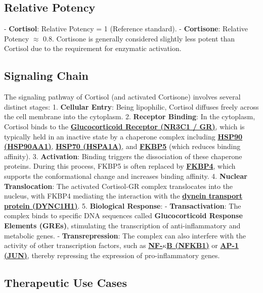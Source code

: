 \documentclass{article}
\begin{document}
\subsection{Relative Potency}
- \textbf{Cortisol}: Relative Potency = 1 (Reference standard).
- \textbf{Cortisone}: Relative Potency $\approx$ 0.8. Cortisone is generally considered slightly less potent than Cortisol due to the requirement for enzymatic activation.

\subsection{Signaling Chain}
The signaling pathway of Cortisol (and activated Cortisone) involves several distinct stages:
1. \textbf{Cellular Entry}: Being lipophilic, Cortisol diffuses freely across the cell membrane into the cytoplasm.
2. \textbf{Receptor Binding}: In the cytoplasm, Cortisol binds to the \textbf{\href{https://www.proteinatlas.org/ENSG00000113580-NR3C1}{Glucocorticoid Receptor (NR3C1 / GR)}}, which is typically held in an inactive state by a chaperone complex including \textbf{\href{https://www.proteinatlas.org/ENSG00000080824-HSP90AA1}{HSP90 (HSP90AA1)}}, \textbf{\href{https://www.proteinatlas.org/ENSG00000204389-HSPA1A}{HSP70 (HSPA1A)}}, and \textbf{\href{https://www.proteinatlas.org/ENSG00000096060-FKBP5}{FKBP5}} (which reduces binding affinity).
3. \textbf{Activation}: Binding triggers the dissociation of these chaperone proteins. During this process, FKBP5 is often replaced by \textbf{\href{https://www.proteinatlas.org/ENSG00000004478-FKBP4}{FKBP4}}, which supports the conformational change and increases binding affinity.
4. \textbf{Nuclear Translocation}: The activated Cortisol-GR complex translocates into the nucleus, with FKBP4 mediating the interaction with the \textbf{\href{https://www.proteinatlas.org/ENSG00000197102-DYNC1H1}{dynein transport protein (DYNC1H1)}}.
5. \textbf{Biological Response}:
    - \textbf{Transactivation}: The complex binds to specific DNA sequences called \textbf{Glucocorticoid Response Elements (GREs)}, stimulating the transcription of anti-inflammatory and metabolic genes.
    - \textbf{Transrepression}: The complex can also interfere with the activity of other transcription factors, such as \textbf{\href{https://www.proteinatlas.org/ENSG00000109320-NFKB1}{NF-\texorpdfstring{$\kappa$}{kappa}B (NFKB1)}} or \textbf{\href{https://www.proteinatlas.org/ENSG00000177606-JUN}{AP-1 (JUN)}}, thereby repressing the expression of pro-inflammatory genes.

\subsection{Therapeutic Use Cases}
\end{document}
